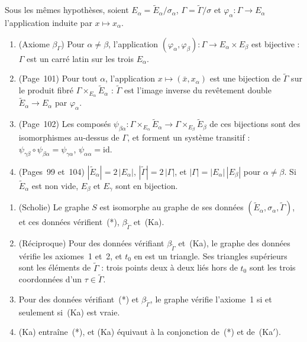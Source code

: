 \begin{enonce}
Sous les mêmes hypothèses, soient $E_\alpha = \widetilde E_\alpha/\sigma_\alpha$, $\Gamma = \widetilde\Gamma/\sigma$ et $\varphi_\alpha : \Gamma \to E_\alpha$ l'application induite par $x \mapsto x_\alpha$.
\begin{enumerate}
\item (Axiome $\beta_\Gamma$) Pour $\alpha \neq \beta$, l'application $(\varphi_\alpha, \varphi_\beta) : \Gamma \to E_\alpha \times E_\beta$ est bijective : $\Gamma$ est un carré latin sur les trois $E_\alpha$.
\item (Page~101) Pour tout $\alpha$, l'application $x \mapsto (\bar x, x_\alpha)$ est une bijection de $\widetilde\Gamma$ sur le produit fibré $\Gamma \times_{E_\alpha} \widetilde E_\alpha$ : $\widetilde\Gamma$ est l'image inverse du revêtement double $\widetilde E_\alpha \to E_\alpha$ par $\varphi_\alpha$.
\item (Page~102) Les composés $\psi_{\beta\alpha} : \Gamma \times_{E_\alpha} \widetilde E_\alpha \to \Gamma \times_{E_\beta} \widetilde E_\beta$ de ces bijections sont des isomorphismes au-dessus de $\Gamma$, et forment un système transitif : $\psi_{\gamma\beta} \circ \psi_{\beta\alpha} = \psi_{\gamma\alpha}$, $\psi_{\alpha\alpha} = \mathrm{id}$.
\item (Pages~99 et~104) $|\widetilde E_\alpha| = 2\,|E_\alpha|$, $|\widetilde\Gamma| = 2\,|\Gamma|$, et $|\Gamma| = |E_\alpha|\,|E_\beta|$ pour $\alpha \neq \beta$. Si $\widetilde E_\alpha$ est non vide, $E_\beta$ et $E_\gamma$ sont en bijection.
\end{enumerate}
\end{enonce}

\begin{encadre}
\begin{theoreme}\leavevmode
\begin{enumerate}
\item (Scholie) Le graphe $S$ est isomorphe au graphe de ses données $(\widetilde E_\alpha, \sigma_\alpha, \widetilde\Gamma)$, et ces données vérifient~(*), $\beta_{\widetilde\Gamma}$ et~(Ka).
\item (Réciproque) Pour des données vérifiant $\beta_{\widetilde\Gamma}$ et~(Ka), le graphe des données vérifie les axiomes~1 et~2, et $t_0$ en est un triangle. Ses triangles supérieurs sont les éléments de $\widetilde\Gamma$ : trois points deux à deux liés hors de $t_0$ sont les trois coordonnées d'un $\tau \in \widetilde\Gamma$.
\item Pour des données vérifiant~(*) et $\beta_{\widetilde\Gamma}$, le graphe vérifie l'axiome~1 si et seulement si~(Ka) est vraie.
\item (Ka) entraîne~(*), et (Ka) équivaut à la conjonction de~(*) et de~(Ka$'$).
\end{enumerate}
\end{theoreme}
\end{encadre}

